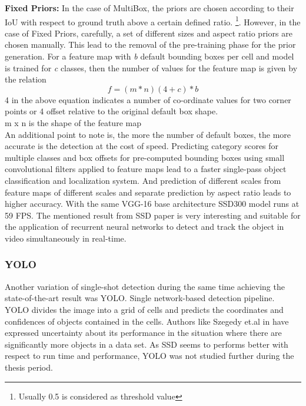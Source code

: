 \textbf{Fixed Priors:} In the case of MultiBox, the priors are chosen according to their IoU with respect to ground truth above a certain defined ratio. \footnote{Usually 0.5 is considered as threshold value}.
However, in the case of Fixed Priors, carefully, a set of different sizes and aspect ratio priors are chosen manually. This lead to the removal of the pre-training phase for the prior generation. For a feature map with \textit{b} default bounding boxes per cell and model is trained for \textit{c} classes, then the number of values for the feature map is given by the relation 
\begin{equation}
	f = (m * n )  (4 + c) * b
\end {equation}
4 in the above equation indicates a number of co-ordinate values for two corner points or 4 offset relative to the original default box shape. \\
m x n is the shape of the feature map \\
 An additional point to note is, the more the number of default boxes, the more accurate is the detection at the cost of speed. Predicting category scores for multiple classes and box offsets for pre-computed bounding boxes using small convolutional filters applied to feature maps lead to a faster single-pass object classification and localization system. And prediction of different scales from feature maps of different scales and separate prediction by aspect ratio leads to higher accuracy. \cite{liu2016ssd} With the same VGG-16 base architecture SSD300 model runs at 59 FPS. The mentioned result from SSD paper is very interesting and suitable for the application of recurrent neural networks to detect and track the object in video simultaneously in real-time.

\subsubsection{YOLO}
Another variation of single-shot detection during the same time achieving the state-of-the-art result was YOLO. Single network-based detection pipeline. YOLO divides the image into a grid of cells and predicts the coordinates and confidences of objects contained in the cells. Authors like Szegedy et.al in \cite{szegedy2014scalable} have expressed uncertainty about its performance in the situation where there are significantly more objects in a data set. As SSD seems to performs better with respect to run time and performance, YOLO was not studied further during the thesis period.


